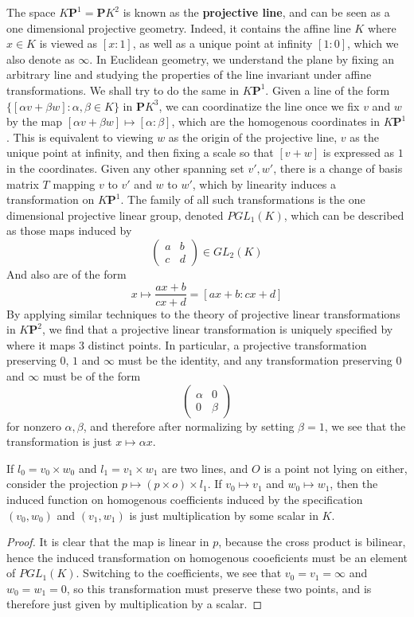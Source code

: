 The space $K\mathbf{P}^1 = \mathbf{P}K^2$ is known as the {\bf projective line}, and can be seen as a one dimensional projective geometry. Indeed, it contains the affine line $K$ where $x \in K$ is viewed as $[x:1]$, as well as a unique point at infinity $[1:0]$, which we also denote as $\infty$. In Euclidean geometry, we understand the plane by fixing an arbitrary line and studying the properties of the line invariant under affine transformations. We shall try to do the same in $K\mathbf{P}^1$. Given a line of the form $\{ [\alpha v + \beta w] : \alpha, \beta \in K \}$ in $\mathbf{P}K^3$, we can coordinatize the line once we fix $v$ and $w$ by the map $[\alpha v + \beta w] \mapsto [\alpha: \beta]$, which are the homogenous coordinates in $K\mathbf{P}^1$. This is equivalent to viewing $w$ as the origin of the projective line, $v$ as the unique point at infinity, and then fixing a scale so that $[v+w]$ is expressed as $1$ in the coordinates. Given any other spanning set $v',w'$, there is a change of basis matrix $T$ mapping $v$ to $v'$ and $w$ to $w'$, which by linearity induces a transformation on $K\mathbf{P}^1$. The family of all such transformations is the one dimensional projective linear group, denoted $PGL_1(K)$, which can be described as those maps induced by
%
\[ \begin{pmatrix} a & b \\ c & d \end{pmatrix} \in GL_2(K) \]
%
And also are of the form
%
\[ x \mapsto \frac{ax + b}{cx + d} = [ax + b: cx + d] \]
%
By applying similar techniques to the theory of projective linear transformations in $K\mathbf{P}^2$, we find that a projective linear transformation is uniquely specified by where it maps 3 distinct points. In particular, a projective transformation preserving $0$, $1$ and $\infty$ must be the identity, and any transformation preserving $0$ and $\infty$ must be of the form
%
\[ \begin{pmatrix} \alpha & 0 \\ 0 & \beta \end{pmatrix} \]
%
for nonzero $\alpha, \beta$, and therefore after normalizing by setting $\beta = 1$, we see that the transformation is just $x \mapsto \alpha x$.

\begin{lemma}
    If $l_0 = v_0 \times w_0$ and $l_1 = v_1 \times w_1$ are two lines, and $O$ is a point not lying on either, consider the projection $p \mapsto (p \times o) \times l_1$. If $v_0 \mapsto v_1$ and $w_0 \mapsto w_1$, then the induced function on homogenous coefficients induced by the specification $(v_0,w_0)$ and $(v_1,w_1)$ is just multiplication by some scalar in $K$.
\end{lemma}
\begin{proof}
    It is clear that the map is linear in $p$, because the cross product is bilinear, hence the induced transformation on homogenous cooeficients must be an element of $PGL_1(K)$. Switching to the coefficients, we see that $v_0 = v_1 = \infty$ and $w_0 = w_1 = 0$, so this transformation must preserve these two points, and is therefore just given by multiplication by a scalar.
\end{proof}

